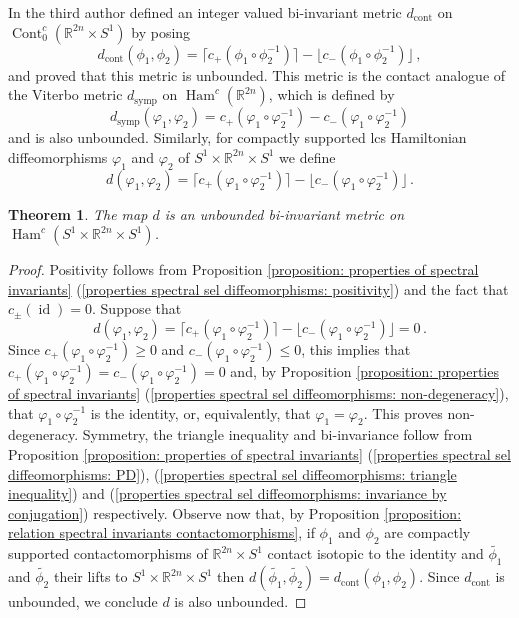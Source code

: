 \documentclass{amsart}
\DeclareMathOperator{\Ham}{Ham}
\DeclareMathOperator{\id}{id}
\DeclareMathOperator{\Cont}{Cont}
\DeclareMathOperator{\symp}{symp}
\DeclareMathOperator{\cont}{cont}
\newtheorem{thm}{Theorem}[section]
\theoremstyle{remark}
\begin{document}
In \cite{San10} the third author defined
an integer valued bi-invariant metric $d_{\cont}$
on $\Cont_0^c (\mathbb{R}^{2n} \times S^1)$
by posing
\[
d_{\cont} (\phi_1, \phi_2)
= \lceil c_+ (\phi_1 \circ \phi_2^{-1}) \rceil
- \lfloor c_- (\phi_1 \circ \phi_2^{-1}) \rfloor \,,
\]
and proved that this metric is unbounded.
This metric is the contact analogue
of the Viterbo metric $d_{\symp}$ on $\Ham^c (\mathbb{R}^{2n})$,
which is defined by
\[
d_{\symp} (\varphi_1, \varphi_2)
= c_+ (\varphi_1 \circ \varphi_2^{-1}) - c_- (\varphi_1 \circ \varphi_2^{-1})
\]
and is also unbounded.
Similarly,
for compactly supported lcs Hamiltonian diffeomorphisms
$\varphi_1$ and $\varphi_2$ of $S^1 \times \mathbb{R}^{2n} \times S^1$
we define
\[
d (\varphi_1, \varphi_2)
= \lceil c_+ (\varphi_1 \circ \varphi_2^{-1}) \rceil
- \lfloor c_- (\varphi_1 \circ \varphi_2^{-1}) \rfloor \,.
\]

\begin{thm}\label{theorem: metric}
The map $d$ is an unbounded bi-invariant metric
on $\Ham^c (S^1 \times \mathbb{R}^{2n} \times S^1)$.
\end{thm}

\begin{proof}
Positivity follows from
Proposition \ref{proposition: properties of spectral invariants}
(\ref{properties spectral sel diffeomorphisms: positivity})
and the fact that $c_{\pm} (\id) = 0$.
Suppose that
\[
d (\varphi_1, \varphi_2)
= \lceil c_+ (\varphi_1 \circ \varphi_2^{-1}) \rceil
- \lfloor c_- (\varphi_1 \circ \varphi_2^{-1}) \rfloor = 0 \,.
\]
Since $c_+ (\varphi_1 \circ \varphi_2^{-1}) \geq 0$
and $c_- (\varphi_1 \circ \varphi_2^{-1}) \leq 0$,
this implies that
$c_+ (\varphi_1 \circ \varphi_2^{-1}) = c_- (\varphi_1 \circ \varphi_2^{-1}) = 0$ and,
by Proposition \ref{proposition: properties of spectral invariants}
(\ref{properties spectral sel diffeomorphisms: non-degeneracy}), that $\varphi_1 \circ \varphi_2^{-1}$ is the identity, or, equivalently, that  $\varphi_1 = \varphi_2$.
This proves non-degeneracy.
Symmetry, the triangle inequality and bi-invariance
follow from Proposition \ref{proposition: properties of spectral invariants}
(\ref{properties spectral sel diffeomorphisms: PD}),
(\ref{properties spectral sel diffeomorphisms: triangle inequality})
and (\ref{properties spectral sel diffeomorphisms: invariance by conjugation})
respectively.
Observe now that,
by Proposition \ref{proposition: relation spectral invariants contactomorphisms},
if $\phi_1$ and $\phi_2$ are compactly supported
contactomorphisms of $\mathbb{R}^{2n} \times S^1$
contact isotopic to the identity
and $\widetilde{\phi_1}$ and $\widetilde{\phi_2}$
their lifts to $S^1 \times \mathbb{R}^{2n} \times S^1$
then $d (\widetilde{\phi_1}, \widetilde{\phi_2})= d_{\cont} (\phi_1, \phi_2)$.
Since $d_{\cont}$ is unbounded,
we conclude $d$ is also unbounded.
\end{proof}
\end{document}
